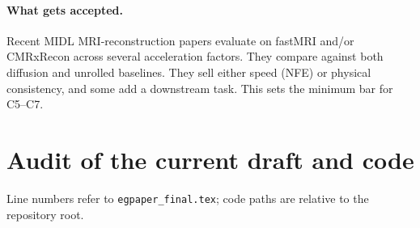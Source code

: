\documentclass[10pt,a4paper]{article}
\newcommand{\code}[1]{\texttt{\small #1}}
\begin{document}
\paragraph{What gets accepted.} Recent MIDL MRI-reconstruction papers
\cite{akoda2026consistency,deng2026subspace,karkalousos2023mtl} evaluate on fastMRI and/or
CMRxRecon across several acceleration factors. They compare against both diffusion and
unrolled baselines. They sell either speed (NFE) or physical consistency, and some add a
downstream task. This sets the minimum bar for C5--C7.

\section{Audit of the current draft and code}
\label{sec:audit}
Line numbers refer to \code{egpaper\_final.tex}; code paths are relative to the
repository root.
\end{document}
